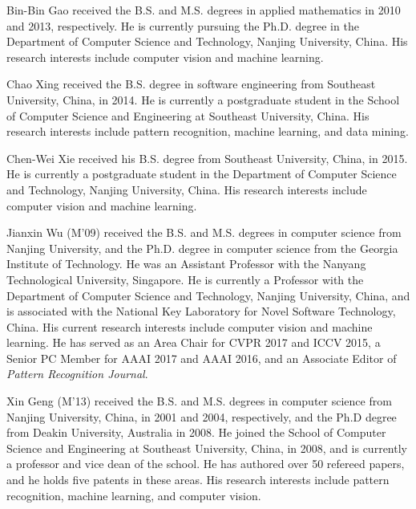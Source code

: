 \documentclass[journal]{IEEEtran}
\begin{document}


\newpage
\begin{IEEEbiography}{Bin-Bin Gao}
received the B.S. and M.S. degrees in applied mathematics in 2010 and 2013, respectively. He is currently pursuing 
the Ph.D. degree in the Department of Computer Science and Technology, Nanjing University, China. 
His research interests include computer vision and machine learning.
\end{IEEEbiography}
\begin{IEEEbiography}{Chao Xing}
received the B.S. degree in software engineering from Southeast University, China, in 2014. 
He is currently a postgraduate student in the School of Computer Science and Engineering at Southeast University, 
China. His research interests include pattern recognition, machine learning, and data mining.
\end{IEEEbiography}
\begin{IEEEbiography}{Chen-Wei Xie}
received his B.S. degree from Southeast University, China, in 2015. He is currently a postgraduate student in 
the Department of Computer Science and Technology, Nanjing University, China. His research interests include 
computer vision and machine learning.
\end{IEEEbiography}
\begin{IEEEbiography}{Jianxin Wu}
(M'09) received the B.S. and M.S. degrees in computer science from Nanjing University, and the Ph.D. degree in computer
science from the Georgia Institute of Technology. He was an Assistant Professor with the Nanyang Technological University, 
Singapore. He is currently a Professor with the Department of Computer Science and Technology, Nanjing University, China,
and is associated with the National Key Laboratory for Novel Software Technology, China. His current research interests 
include computer vision and machine learning. He has served as an Area Chair for CVPR 2017 and ICCV 2015, a Senior PC Member 
for AAAI 2017 and AAAI 2016, and an Associate Editor of \emph{Pattern Recognition Journal}.
\end{IEEEbiography}
\begin{IEEEbiography}{Xin Geng}
(M'13) received the B.S. and M.S. degrees in computer science from Nanjing University, China, in 2001 
and 2004, respectively, and the Ph.D degree from Deakin University, Australia in 2008. He joined the School 
of Computer Science and Engineering at Southeast University, China, in 2008, and is currently a professor 
and vice dean of the school. He has authored over 50 refereed papers, and he holds five patents in these areas. 
His research interests include pattern recognition, machine learning, and computer vision.  
\end{IEEEbiography}
\vfill
\end{document}

